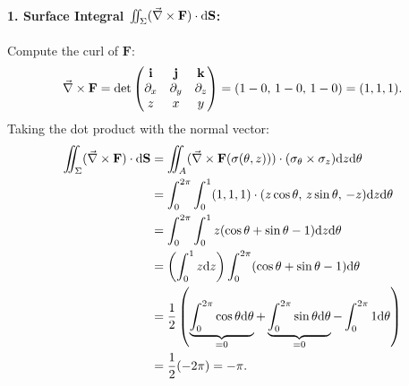\begin{exemple}
\paragraph{1. Surface Integral $\iint_{\Sigma} (\vec{\nabla}\times \mathbf{F}) \cdot \mathrm{d}\mathbf{S}$:}
Compute the curl of $\mathbf{F}$:
\begin{equation*}
    \vec{\nabla}\times \mathbf{F} = \det \begin{pmatrix} \mathbf{i} & \mathbf{j} & \mathbf{k} \\ \partial_x & \partial_y & \partial_z \\ z & x & y \end{pmatrix} = (1 - 0, \, 1 - 0, \, 1 - 0) = (1, 1, 1).
\end{equation*}
Taking the dot product with the normal vector:
\begin{align*}
    \iint_{\Sigma} (\vec{\nabla}\times \mathbf{F}) \cdot \mathrm{d}\mathbf{S} &= \iint_{A} (\vec{\nabla}\times \mathbf{F}(\sigma(\theta,z))) \cdot (\sigma_\theta \times \sigma_z) \mathrm{d} z \mathrm{d}\theta \\
    &= \int_0^{2\pi} \int_0^1 (1, 1, 1) \cdot (z \cos\theta, \, z \sin\theta, \, -z) \mathrm{d} z \mathrm{d}\theta \\
    &= \int_0^{2\pi} \int_0^1 z(\cos\theta + \sin\theta - 1) \mathrm{d} z \mathrm{d}\theta \\
    &= \left( \int_0^1 z \mathrm{d} z \right) \int_0^{2\pi} (\cos\theta + \sin\theta - 1) \mathrm{d}\theta \\
    &= \frac{1}{2} \left( \underbrace{\int_0^{2\pi} \cos\theta \mathrm{d}\theta}_{= 0} + \underbrace{\int_0^{2\pi} \sin\theta \mathrm{d}\theta}_{= 0} - \int_0^{2\pi} 1 \mathrm{d}\theta \right) \\
    &= \frac{1}{2} (-2\pi) = \mathbf{-\pi}.
\end{align*}


\end{exemple}
